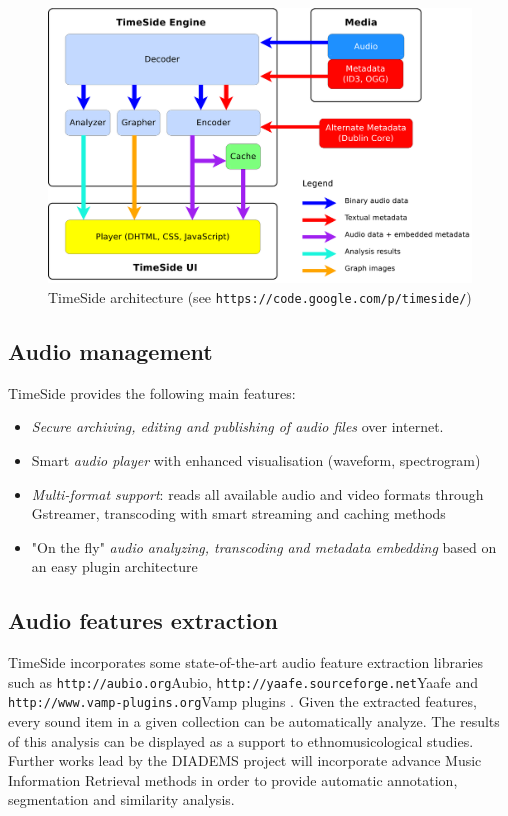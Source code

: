 \documentclass{aes53i}
\begin{document}
\begin{figure}[htbp]
  \centering
  \includegraphics[width=0.95\linewidth]{img/timeside_schema.pdf}
  \caption{TimeSide architecture (see \texttt{https://code.google.com/p/timeside/})}\label{fig:TimeSide_Archi}
\end{figure}


\subsection{Audio management}
TimeSide provides the following main features:
\begin{itemize}
\item \emph{Secure archiving, editing and publishing of audio files} over
  internet.
\item Smart \emph{audio player} with enhanced visualisation (waveform, spectrogram)
\item \emph{Multi-format support}: reads all available audio and video formats  through Gstreamer, transcoding with smart streaming and caching methods%
\item "On the fly" \emph{audio analyzing, transcoding and metadata
    embedding} based on an easy plugin architecture
\end{itemize}

\subsection{Audio features extraction}
TimeSide incorporates some state-of-the-art audio feature extraction libraries such as \texttt{http://aubio.org}{Aubio}, \texttt{http://yaafe.sourceforge.net}{Yaafe} and \texttt{http://www.vamp-plugins.org}{Vamp plugins} \cite{brossierPhD,yaafe_ISMIR2010,vamp-plugins}.
Given the extracted features, every sound item in a given collection can be automatically analyze. The results of this analysis can be displayed as a support to ethnomusicological studies.
Further works lead by the DIADEMS project will incorporate advance Music Information Retrieval methods in order to provide automatic annotation, segmentation and similarity analysis.
\vspace{-0.2cm}
\end{document}
